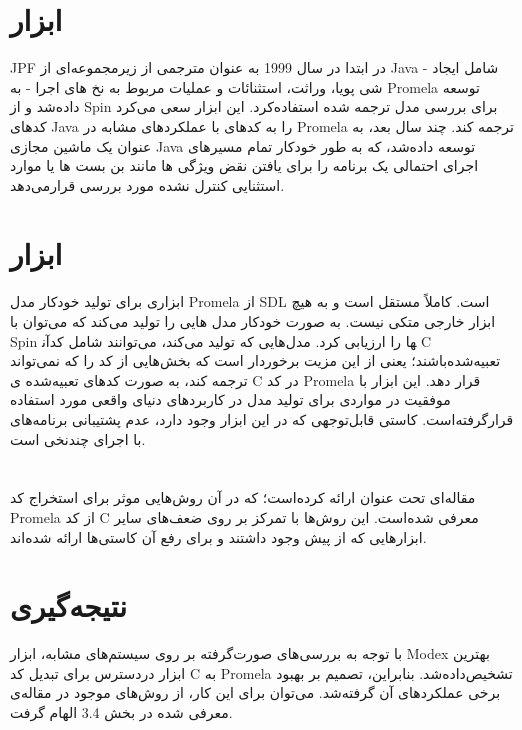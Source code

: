 \section{ابزار }
JPF \cite{3} در ابتدا در سال 1999 به عنوان مترجمی از زیرمجموعه‌ای از Java - شامل ایجاد شی پویا، وراثت، استثنائات و عملیات مربوط به نخ های اجرا - به Promela توسعه داده‌شد و از Spin برای بررسی مدل ترجمه شده استفاده‌کرد. این ابزار سعی می‌کرد کدهای Java را به کدهای با عملکردهای مشابه در Promela ترجمه کند. چند سال بعد، به عنوان یک ماشین مجازی Java  توسعه داده‌شد، که به طور خودکار تمام مسیرهای اجرای احتمالی یک برنامه را برای یافتن نقض ویژگی ها  مانند بن بست  ها یا موارد استثنایی کنترل نشده  مورد بررسی قرار‌می‌دهد.

\section{ابزار }
 \cite{5} ابزاری برای تولید خودکار مدل Promela از SDL است. کاملاً مستقل است و به هیچ ابزار خارجی متکی نیست. به صورت خودکار مدل هایی را تولید می‌کند که می‌توان با Spin آن‎ها را ارزیابی کرد. مدل‌هایی که تولید می‌کند، می‌توانند شامل کد C تعبیه‌شده‌باشند؛ یعنی از این مزیت برخوردار است که بخش‌هایی از کد را که نمی‌تواند ترجمه کند، به صورت کدهای تعبیه‌شده ی C در کد Promela قرار دهد. این ابزار با موفقیت در مواردی برای تولید مدل در کاربردهای دنیای واقعی مورد استفاده قرار‌گرفته‌است. کاستی قابل‌توجهی که در این ابزار وجود دارد، عدم پشتیبانی برنامه‌های با اجرای چندنخی  است. 


\section{}
 مقاله‌ای تحت عنوان  \cite{6} ارائه کرده‌است؛ که در آن روش‌هایی موثر برای استخراج کد Promela از کد C معرفی شده‌‌است. این روش‌ها با تمرکز بر روی ضعف‌های سایر ابزارهایی که از پیش وجود داشتند و برای رفع آن کاستی‌ها ارائه شده‌اند. 


\section{نتیجه‌گیری}
با توجه به بررسی‌های صورت‌گرفته بر روی سیستم‌های مشابه، ابزار Modex بهترین ابزار دردسترس برای تبدیل کد C به Promela تشخیص‌داده‌شد. بنابراین، تصمیم بر بهبود برخی عملکردهای آن گرفته‌شد. می‌توان برای این کار، از روش‌های موجود در مقاله‌ی معرفی شده در بخش 3.4 الهام گرفت.
